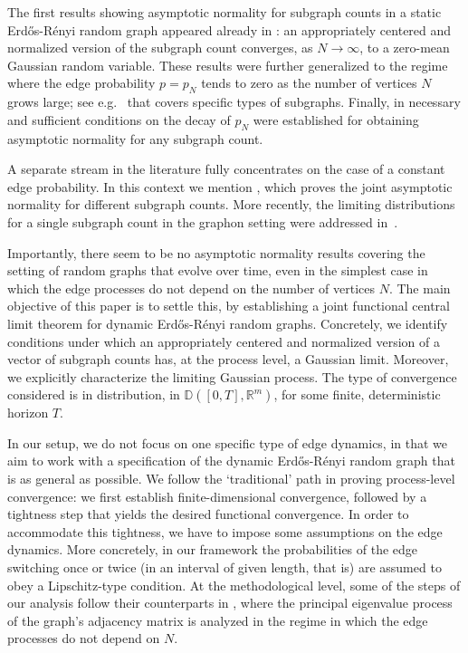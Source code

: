 \documentclass[11pt,reqno]{amsart}
\numberwithin{equation}{section}
\newcommand{\R}{\mathbb{R}}
\begin{document}
 The first results showing asymptotic normality for subgraph counts in a static Erd\H{o}s-R\'enyi random graph appeared already in \cite{erdos1960evolution}: an appropriately centered and normalized version of the subgraph count converges, as $N\to\infty$, to a zero-mean Gaussian random variable. These results were further generalized to the regime where the edge probability $p=p_N$ tends to zero as the number of vertices $N$ grows large; see e.g.\ \cite{nowicki1988subgraph} that covers specific types of subgraphs. Finally, in \cite{rucinski1988small} necessary and sufficient conditions on the decay of $p_N$ were established for obtaining asymptotic normality for any subgraph count.

A separate stream in the literature fully concentrates on the case of a constant edge probability. In this context we mention \cite{nowicki1989asymptotic}, which proves the joint asymptotic normality for different subgraph counts. More recently, the limiting distributions for a single subgraph count in the graphon setting were addressed in~\cite{hladky2021limit,bhattacharya2023fluctuations}. 

\medskip


Importantly, there seem to be no asymptotic normality results covering the setting of random graphs that evolve over time, even in the simplest case in which the edge processes do not depend on the number of vertices $N$. The main objective of this paper is to settle this, by establishing a joint functional central limit theorem for dynamic Erd\H{o}s-R\'enyi random graphs. Concretely, we identify conditions under which an appropriately centered and normalized version of a vector of subgraph counts has, at the process level, a Gaussian limit. Moreover, we explicitly characterize the limiting Gaussian process. 
{The type of convergence considered is in distribution, in $\mathbb{D}([0,T],\R^{m})$, for some finite, deterministic horizon $T$.}


In our setup, we do not focus on one specific type of edge dynamics, in that we  aim to work with a specification of the dynamic Erd\H{o}s-R\'enyi random graph that is as general as possible. We follow the `traditional' path in proving process-level convergence: we first establish finite-dimensional convergence, followed by a tightness step that yields the desired functional convergence. In order to accommodate this tightness, we have to impose some assumptions on the edge dynamics. More concretely, in our framework the probabilities of the edge switching once or twice (in an interval of given length, that is) are assumed to obey a Lipschitz-type condition. At the methodological level, some of the steps of our analysis follow their counterparts in \cite{hazra2024principle}, where the principal eigenvalue process of the graph's adjacency matrix is analyzed in the regime in which the edge processes do not depend on $N$.
\end{document}
